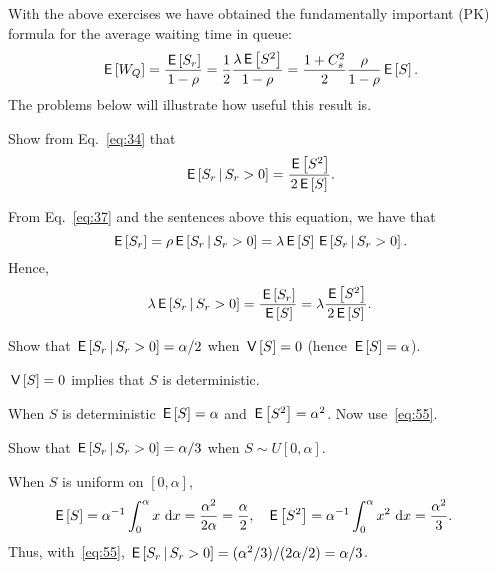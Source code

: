 With the above exercises  we have obtained the fundamentally important  (PK) formula for the average waiting time in queue:
\begin{equation} \label{eq:710}
  \,\mathsf{E}\left[W_Q\right] = \frac{\,\mathsf{E}\left[S_r\right]}{1-\rho} =\frac 1 2 \frac{\lambda \,\mathsf{E}\left[S^2\right]}{1-\rho} =\frac{1 + C_s^2}2 \frac{\rho}{1-\rho}  \,\mathsf{E}\left[S\right].
\end{equation}
The problems below will illustrate how useful this result is.


\begin{exercise}[\faFlask]
\label{ex:9}
Show from Eq.~\eqref{eq:34} that 
\begin{equation}\label{eq:55}
\,\mathsf{E}\left[S_r\,\middle|\, S_r>0\right] = \frac{\,\mathsf{E}\left[S^2\right]}{2 \,\mathsf{E}\left[S\right]}.
\end{equation}
\begin{solution}
 From Eq.~\eqref{eq:37} and the sentences above this equation,
    we have that
    \begin{equation*}
    \,\mathsf{E}\left[S_r\right] = \rho \,\mathsf{E}\left[S_r\,\middle|\, S_r>0\right]=\lambda \,\mathsf{E}\left[S\right] \,\mathsf{E}\left[S_r\,\middle|\, S_r>0\right].
    \end{equation*}
Hence,
    \begin{equation*}
    \lambda \,\mathsf{E}\left[S_r\,\middle|\, S_r>0\right] = \frac{\,\mathsf{E}\left[S_r\right]}{\,\mathsf{E}\left[S\right]} = \lambda \frac{\,\mathsf{E}\left[S^2\right]}{2 \,\mathsf{E}\left[S\right]}.
    \end{equation*}
\end{solution}
\end{exercise}


\begin{exercise}[\faFlask]
Show that  $\,\mathsf{E}\left[S_r\,\middle|\, S_r>0\right] = \alpha/2$  when $\,\mathsf{V}\left[S\right] = 0$ (hence $\,\mathsf{E}\left[S\right] = \alpha$).
  \begin{hint}
    $\,\mathsf{V}\left[S\right] = 0$ implies that $S$ is deterministic.
  \end{hint}
\begin{solution}
 When $S$ is deterministic $\,\mathsf{E}\left[S\right]= \alpha$ and $\,\mathsf{E}\left[S^2\right] = \alpha^2$.  Now use~\eqref{eq:55}.
\end{solution}
\end{exercise}

\begin{exercise}{\faCalculator}
Show that $\,\mathsf{E}\left[S_r\,\middle|\, S_r>0\right] = \alpha/3$ when  $S \sim U[0, \alpha]$.
\begin{solution}
 When $S$ is uniform on $[0, \alpha]$,
 \begin{align*}
    \,\mathsf{E}\left[S\right] &= \alpha^{-1}\int_0^\alpha x \, \,\text{d}x =\frac{\alpha^2}{2 \alpha} =  \frac{\alpha}2, 
&
\,\mathsf{E}\left[S^2\right] &= \alpha^{-1}\int_0^\alpha x^2 \, \,\text{d}x = \frac{\alpha^2}3.   
 \end{align*}
 Thus, with~\eqref{eq:55}, $\,\mathsf{E}\left[S_r\,\middle|\, S_r>0\right] = (\alpha^2/3)/(2 \alpha/2) = \alpha/3$. 
\end{solution}
\end{exercise}

